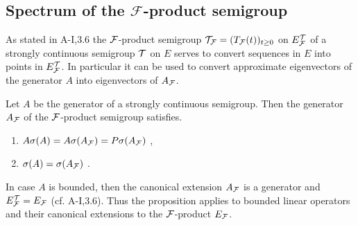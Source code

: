 \subsection{Spectrum of the 
\texorpdfstring{$\mathcal{F}$-product}{F-product} semigroup}\label{subsec:a3-4.5}
As stated in A-I,3.6 the $\mathcal{F}$-product semigroup $\mathcal{T}_{\mathcal{F}} = (T_{\mathcal{F}}(t))_{t \geq 0}$ on $E_{\mathcal{F}}^{\mathcal{T}}$ of a strongly continuous semigroup $\mathcal{T}$ on $E$ serves to convert sequences in $E$ into points in $E_{\mathcal{F}}^{\mathcal{T}}$.
In particular it can be used to convert approximate eigenvectors of the generator $A$ into eigenvectors of $A_{\mathcal{F}}$.
\begin{proposition}\label{prop:a3-4.4}
Let $A$ be the generator of a strongly continuous semigroup. Then the generator $A_{\mathcal{F}}$ of the $\mathcal{F}$-product semigroup satisfies.
\begin{enumerate}[\upshape (i)]
\item 
	$A\sigma(A) = A\sigma(A_{\mathcal{F}}) = P\sigma(A_{\mathcal{F}})$ ,

\item 
	$\sigma(A) = \sigma(A_{\mathcal{F}})$ .
\end{enumerate}
\end{proposition}
\begin{remark}
In case $A$ is bounded, then the canonical extension $A_{\mathcal{F}}$ is a generator and $E_{\mathcal{F}}^{\mathcal{T}} = E_{\mathcal{F}}$ (cf. A-I,3.6).
Thus the proposition applies to bounded linear operators and their canonical extensions to the 
$\mathcal{F}$-product $E_{\mathcal{F}}$.
\end{remark}
